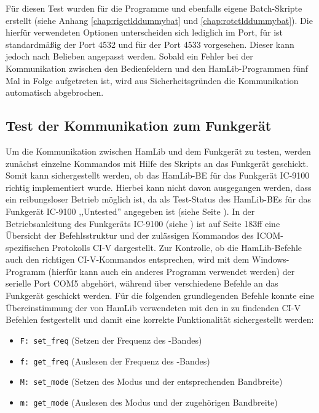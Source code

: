 Für diesen Test wurden für die Programme  und  ebenfalls eigene Batch-Skripte erstellt (siehe Anhang \ref{chap:rigctlddummybat} und \ref{chap:rotctlddummybat}). Die hierfür verwendeten Optionen unterscheiden sich lediglich im Port, für  ist standardmäßig der Port 4532 und für  der Port 4533 vorgesehen. Dieser kann jedoch nach Belieben angepasst werden.
\clearpage
Sobald ein Fehler bei der Kommunikation zwischen den Bedienfeldern und den HamLib-Programmen fünf Mal in Folge aufgetreten ist, wird aus Sicherheitsgründen die Kommunikation automatisch abgebrochen.

\subsection{Test der Kommunikation zum Funkgerät}
\label{chap:rigtest}

Um die Kommunikation zwischen HamLib und dem Funkgerät zu testen, werden zunächst einzelne Kommandos mit Hilfe des Skripts  an das Funkgerät geschickt. Somit kann sichergestellt werden, ob das HamLib-\acl{BE} für das Funkgerät IC-9100 richtig implementiert wurde. Hierbei kann nicht davon ausgegangen werden, dass ein reibungsloser Betrieb möglich ist, da als Test-Status des HamLib-\acl{BE}s für das Funkgerät IC-9100 ,,Untested'' angegeben ist (siehe Seite \pageref{hamlibbackend}).\newpar
In der Betriebsanleitung des Funkgeräts IC-9100 (siehe \cite{radiomanual}) ist auf Seite 183ff eine Übersicht der Befehlsstruktur und der zulässigen Kommandos des ICOM-spezifischen Protokolls CI-V dargestellt. Zur Kontrolle, ob die HamLib-Befehle auch den richtigen CI-V-Kommandos entsprechen, wird mit dem Windows-Programm  (hierfür kann auch ein anderes Programm verwendet werden) der serielle Port COM5 abgehört, während über  verschiedene Befehle an das Funkgerät geschickt werden.\newpar
Für die folgenden grundlegenden Befehle konnte eine Übereinstimmung der von HamLib verwendeten mit den in \cite{radiomanual} zu findenden CI-V Befehlen festgestellt und damit eine korrekte Funktionalität sichergestellt werden:

\begin{itemize}
	\parskip0pt
	\item \texttt{F: set\_freq} (Setzen der Frequenz des -Bandes)
	\item \texttt{f: get\_freq} (Auslesen der Frequenz des -Bandes)
	\item \texttt{M: set\_mode} (Setzen des Modus und der entsprechenden Bandbreite)
	\item \texttt{m: get\_mode} (Auslesen des Modus und der zugehörigen Bandbreite)
\end{itemize}

